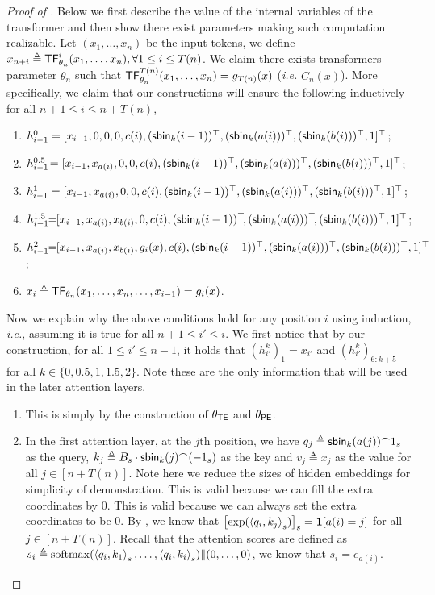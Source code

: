 \begin{proof}[Proof of ]
	Below we first describe the value of the internal variables of the transformer and then show there exist parameters making such computation realizable. Let $(x_1,\ldots, x_n)$ be the input tokens, we define $x_{n+i}\triangleq \mathsf{TF}^i_{\theta_n}(x_1,\ldots,x_n), \forall 1\le i\le T(n)$. We claim there exists transformers parameter $\theta_n$ such that $\mathsf{TF}^{T(n)}_{\theta_n}(x_1,\ldots,x_n) = g_{T(n)}(x)$ (\emph{i.e.} $C_n(x)$). More specifically, we claim that our constructions will ensure the following inductively for all $n+1\le i\le n+T(n)$,
	\begin{enumerate}
		\item $h^0_{i-1}= [x_{i-1},0,0,0, c(i), (\mathsf{sbin}_k(i-1))^\top , (\mathsf{sbin}_k(a(i)))^\top, (\mathsf{sbin}_k(b(i)))^\top,1]^\top$;
		\item $h^{0.5}_{i-1}\!= [x_{i-1},x_{a(i)},0,0, c(i),(\mathsf{sbin}_k(i-1))^\top , (\mathsf{sbin}_k(a(i)))^\top, (\mathsf{sbin}_k(b(i)))^\top,1]^\top$;
		\item $h^{1}_{i-1}= [x_{i-1},x_{a(i)},0,0, c(i),(\mathsf{sbin}_k(i-1))^\top , (\mathsf{sbin}_k(a(i)))^\top, (\mathsf{sbin}_k(b(i)))^\top,1]^\top$;
		\item $h^{1.5}_{i-1}\!\!=\!\! [x_{i-1},x_{a(i)},x_{b(i)},0, c(i),(\mathsf{sbin}_k(i-1))^\top\!, (\mathsf{sbin}_k(a(i)))^\top\!, (\mathsf{sbin}_k(b(i)))^\top,1]^\top$;
		\item $h^{2}_{i-1}\!\!= \!\![x_{i-1},x_{a(i)},x_{b(i)}, g_i(x),c(i),(\mathsf{sbin}_k(i-1))^\top , (\mathsf{sbin}_k(a(i)))^\top, (\mathsf{sbin}_k(b(i)))^\top,1]^\top$;
		\item $x_{i} \triangleq \mathsf{TF}_{\theta_n}(x_1,\ldots,x_n,\ldots,x_{i-1}) =  g_{i}(x)$.
	\end{enumerate} 
	
	Now we explain why the above conditions hold for any position $i$ using induction, \emph{i.e.}, assuming it is true for all $n+1\le i'\le i$. We first notice that by our construction, for all $1\le i' \le n-1$, it holds that $(h_{i'}^k)_1 = x_{i'}$ and $(h_{i'}^k)_{6:k+5}$ for all $k\in\{0,0.5,1,1.5,2\}$. Note these are the only information that will be used in the later attention layers.
	\begin{enumerate}
		\item This is simply by the construction of $\theta_{\mathsf{TE}}$ and $\theta_{\mathsf{PE}}$.
		\item In the first attention layer, at the $j$th position, we have $q_j \triangleq \mathsf{sbin}_k(a(j))^\frown 1_s$ as the query, $k_j \triangleq B_s \cdot \mathsf{sbin}_k(j)^\frown (-1_s)$ as the key and $v_j\triangleq x_j$ as the value for all $j\in[n+T(n)]$. Note here we reduce the sizes of hidden embeddings for simplicity of demonstration. This is valid because we can fill the extra coordinates by 0. This is valid because we can always set the extra coordinates to be $0$. By , we know that $\left[\exp(\left\langle q_i,k_j \right\rangle_s)\right]_s={\bm 1}[a(i)=j]$ for all $j\in[n + T(n)]$. Recall that the attention scores are defined as $s_i \triangleq \mathrm{softmax}(\left\langle q_i,k_1 \right\rangle_s,\ldots,\left\langle q_i,k_i \right\rangle_s) \| (0,\ldots, 0) $, we know that $s_i = e_{a(i)}$.
		

\end{enumerate}
\end{proof}
